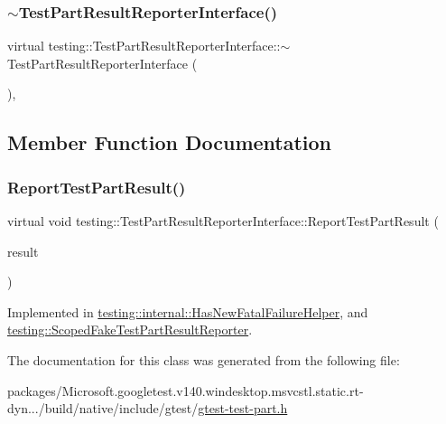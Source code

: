 \subsubsection{\texorpdfstring{$\sim$TestPartResultReporterInterface()}{~TestPartResultReporterInterface()}}
{\footnotesize\ttfamily virtual testing\+::\+Test\+Part\+Result\+Reporter\+Interface\+::$\sim$\+Test\+Part\+Result\+Reporter\+Interface (\begin{DoxyParamCaption}{ }\end{DoxyParamCaption})\hspace{0.3cm}{\ttfamily [inline]}, {\ttfamily [virtual]}}



\subsection{Member Function Documentation}
\mbox{\label{classtesting_1_1_test_part_result_reporter_interface_aa2f920e7a5a0a6d0faf19e3727928c22}} 
\subsubsection{\texorpdfstring{ReportTestPartResult()}{ReportTestPartResult()}}
{\footnotesize\ttfamily virtual void testing\+::\+Test\+Part\+Result\+Reporter\+Interface\+::\+Report\+Test\+Part\+Result (\begin{DoxyParamCaption}\item[{const \mbox{\hyperlink{classtesting_1_1_test_part_result}{Test\+Part\+Result}} \&}]{result }\end{DoxyParamCaption})\hspace{0.3cm}{\ttfamily [pure virtual]}}



Implemented in \mbox{\hyperlink{classtesting_1_1internal_1_1_has_new_fatal_failure_helper_ac7b5e77c9847b2b057cb97193ba82441}{testing\+::internal\+::\+Has\+New\+Fatal\+Failure\+Helper}}, and \mbox{\hyperlink{classtesting_1_1_scoped_fake_test_part_result_reporter_a3bc6cb939cbc3db71ece8846e6bafe00}{testing\+::\+Scoped\+Fake\+Test\+Part\+Result\+Reporter}}.



The documentation for this class was generated from the following file\+:\begin{DoxyCompactItemize}
\item 
packages/\+Microsoft.\+googletest.\+v140.\+windesktop.\+msvcstl.\+static.\+rt-\/dyn.../build/native/include/gtest/\mbox{\hyperlink{gtest-test-part_8h}{gtest-\/test-\/part.\+h}}\end{DoxyCompactItemize}
